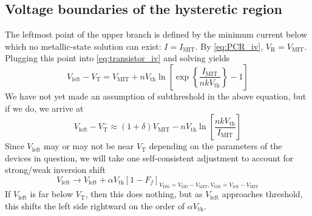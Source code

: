\documentclass[letterpaper]{article}
\newcommand{\VT}{\ensuremath{V_\mathrm{T}}}
\newcommand{\VTm}{\ensuremath{V_\mathrm{T}^-}}
\newcommand{\VDD}{\ensuremath{V_\mathrm{DD}}}
\newcommand{\Vth}{\ensuremath{V_\mathrm{th}}}
\newcommand{\VGSi}{\ensuremath{V_\mathrm{GSi}}}
\newcommand{\VDSi}{\ensuremath{V_\mathrm{DSi}}}
\newcommand{\VMIT}{\ensuremath{V_\mathrm{MIT}}}
\newcommand{\IMIT}{\ensuremath{I_\mathrm{MIT}}}
\begin{document}
\subsection{Voltage boundaries of the hysteretic region}
The leftmost point of the upper branch is defined by the minimum current below which no metallic-state solution can exist: $I=\IMIT $.  By \eqref{eq:PCR_iv}, $V_\mathrm{R}=V_\mathrm{MIT}$.  Plugging this point into \eqref{eq:transistor_iv} and solving yields
\begin{equation}
V_\mathrm{left}-\VT=V_\mathrm{MIT}+n\Vth \ln\left[\exp\left\{\frac{\IMIT }{nk\Vth }\right\}-1\right]
\end{equation}
We have not yet made an assumption of subthreshold in the above equation, but if we do, we arrive at
\begin{equation}
V_\mathrm{left}-\VTm\approx (1+\delta)V_\mathrm{MIT}-n\Vth \ln\left[\frac{nk\Vth }{\IMIT }\right]
\label{eq:Vleft_sub}
\end{equation}
Since $V_\mathrm{left}$ may or may not be near $\VT$ depending on the parameters of the devices in question, we will take one self-consistent adjustment to account for strong/weak inversion shift
\begin{equation}
  V_\mathrm{left}\rightarrow V_\mathrm{left}+\alpha\Vth \left[1-F_f\right]_{\VDSi=\VDD-\VMIT, \VGSi=V_\mathrm{left}-\VMIT}
\label{eq:Vleft_sub2}
\end{equation}
If $V_\mathrm{left}$ is far below $\VT$, then this does nothing, but as $V_\mathrm{left}$ approaches threshold, this shifts the left side rightward on the order of $\alpha\Vth$.
\end{document}
